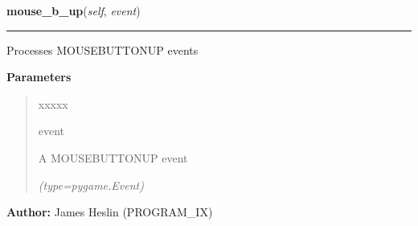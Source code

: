 \hspace{.8\funcindent}\begin{boxedminipage}{\funcwidth}

    \raggedright \textbf{mouse\_b\_up}(\textit{self}, \textit{event})

    \vspace{-1.5ex}

    \rule{\textwidth}{0.5\fboxrule}
\setlength{\parskip}{2ex}
    Processes MOUSEBUTTONUP events

\setlength{\parskip}{1ex}
      \textbf{Parameters}
      \vspace{-1ex}

      \begin{quote}
        \begin{Ventry}{xxxxx}

          \item[event]

          A MOUSEBUTTONUP event

            {\it (type=pygame.Event)}

        \end{Ventry}

      \end{quote}

\textbf{Author:} James Heslin (PROGRAM\_IX)



    \end{boxedminipage}

    \label{pystroke:input_engine:InputEngine:key_down}

    \vspace{0.5ex}

